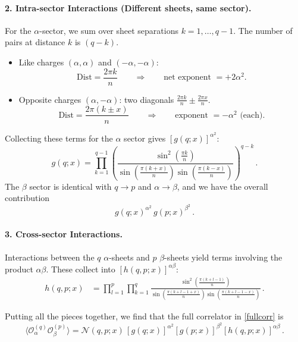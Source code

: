 \documentclass[11pt]{article}
\begin{document}
\paragraph{2. Intra-sector Interactions (Different sheets, same sector).}
For the $\alpha$-sector, we sum over sheet separations $k = 1, \dots, q-1$. The number of pairs at distance $k$ is $(q-k)$.
\begin{itemize}
    \item Like charges $(\alpha, \alpha)$ and $(-\alpha, -\alpha)$:
    \[
    \text{Dist} = \frac{2\pi k}{n}
    \qquad\Rightarrow\qquad
    \text{net exponent } = +2\alpha^2.
    \]
    \item Opposite charges $(\alpha, -\alpha)$: two diagonals $\frac{2\pi k}{n} \pm \frac{2\pi x}{n}$.
    \[
    \text{Dist} = \frac{2\pi (k\pm x)}{n}
    \qquad\Rightarrow\qquad
    \text{exponent } = -\alpha^2 \text{ (each)}.
    \]
\end{itemize}
Collecting these terms for the $\alpha$ sector gives $[g(q;x)]^{\alpha^2}$:
\begin{equation}
g(q;x) = \prod_{k=1}^{q-1} \left( \frac{\sin^2(\frac{\pi k}{n})}{\sin(\frac{\pi(k+x)}{n}) \sin(\frac{\pi(k-x)}{n})} \right)^{q-k}\,.
\end{equation}
The $\beta$ sector is identical with $q \to p$ and $\alpha \to \beta$, and we have the overall contribution
\begin{equation}
g(q;x)^{\alpha^2}\,g(p;x)^{\beta^2}\,.
\end{equation}

\paragraph{3. Cross-sector Interactions.}
Interactions between the $q$ $\alpha$-sheets and $p$ $\beta$-sheets yield terms involving the product $\alpha \beta$. These collect into $[h(q,p;x)]^{\alpha\beta}$:
\begin{align}\label{hfunct}
h(q,p;x)
&= \prod_{l=1}^{p} \prod_{k=1}^{q}
\frac{\sin^2(\frac{\pi(k+l-1)}{n})}{\sin(\frac{\pi(k+l-1+x)}{n}) \sin(\frac{\pi(k+l-1-x)}{n})}\,.
\end{align}

Putting all the pieces together, we find that the full correlator in \eqref{fullcorr} is
\begin{equation}
\label{eq:mixed_correlator}
\langle \mathcal{O}_{\alpha}^{(q)} \mathcal{O}_{\beta}^{(p)} \rangle =
\mathcal{N}(q,p;x)\,
\left[ g(q;x) \right]^{\alpha^2}
\left[ g(p;x) \right]^{\beta^2}
\left[ h(q,p;x) \right]^{\alpha\beta}\,.
\end{equation}
\end{document}
